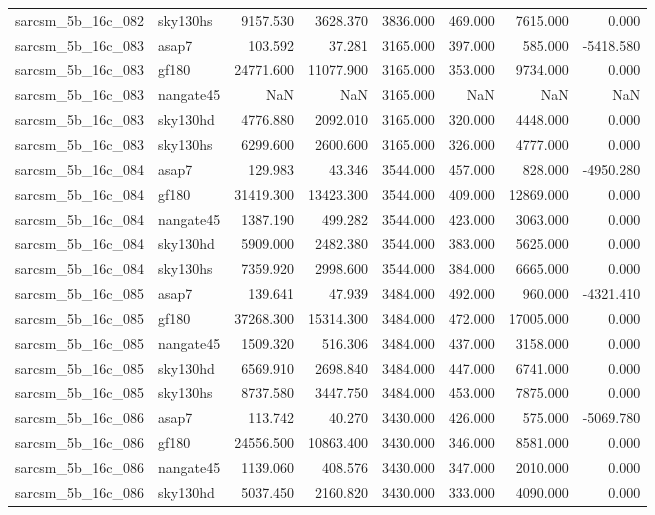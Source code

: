 \begin{tabular}{llrrrrrr}
sarcsm\_5b\_16c\_082 & sky130hs & 9157.530 & 3628.370 & 3836.000 & 469.000 & 7615.000 & 0.000 \\
sarcsm\_5b\_16c\_083 & asap7 & 103.592 & 37.281 & 3165.000 & 397.000 & 585.000 & -5418.580 \\
sarcsm\_5b\_16c\_083 & gf180 & 24771.600 & 11077.900 & 3165.000 & 353.000 & 9734.000 & 0.000 \\
sarcsm\_5b\_16c\_083 & nangate45 & NaN & NaN & 3165.000 & NaN & NaN & NaN \\
sarcsm\_5b\_16c\_083 & sky130hd & 4776.880 & 2092.010 & 3165.000 & 320.000 & 4448.000 & 0.000 \\
sarcsm\_5b\_16c\_083 & sky130hs & 6299.600 & 2600.600 & 3165.000 & 326.000 & 4777.000 & 0.000 \\
sarcsm\_5b\_16c\_084 & asap7 & 129.983 & 43.346 & 3544.000 & 457.000 & 828.000 & -4950.280 \\
sarcsm\_5b\_16c\_084 & gf180 & 31419.300 & 13423.300 & 3544.000 & 409.000 & 12869.000 & 0.000 \\
sarcsm\_5b\_16c\_084 & nangate45 & 1387.190 & 499.282 & 3544.000 & 423.000 & 3063.000 & 0.000 \\
sarcsm\_5b\_16c\_084 & sky130hd & 5909.000 & 2482.380 & 3544.000 & 383.000 & 5625.000 & 0.000 \\
sarcsm\_5b\_16c\_084 & sky130hs & 7359.920 & 2998.600 & 3544.000 & 384.000 & 6665.000 & 0.000 \\
sarcsm\_5b\_16c\_085 & asap7 & 139.641 & 47.939 & 3484.000 & 492.000 & 960.000 & -4321.410 \\
sarcsm\_5b\_16c\_085 & gf180 & 37268.300 & 15314.300 & 3484.000 & 472.000 & 17005.000 & 0.000 \\
sarcsm\_5b\_16c\_085 & nangate45 & 1509.320 & 516.306 & 3484.000 & 437.000 & 3158.000 & 0.000 \\
sarcsm\_5b\_16c\_085 & sky130hd & 6569.910 & 2698.840 & 3484.000 & 447.000 & 6741.000 & 0.000 \\
sarcsm\_5b\_16c\_085 & sky130hs & 8737.580 & 3447.750 & 3484.000 & 453.000 & 7875.000 & 0.000 \\
sarcsm\_5b\_16c\_086 & asap7 & 113.742 & 40.270 & 3430.000 & 426.000 & 575.000 & -5069.780 \\
sarcsm\_5b\_16c\_086 & gf180 & 24556.500 & 10863.400 & 3430.000 & 346.000 & 8581.000 & 0.000 \\
sarcsm\_5b\_16c\_086 & nangate45 & 1139.060 & 408.576 & 3430.000 & 347.000 & 2010.000 & 0.000 \\
sarcsm\_5b\_16c\_086 & sky130hd & 5037.450 & 2160.820 & 3430.000 & 333.000 & 4090.000 & 0.000 \\

\end{tabular}
